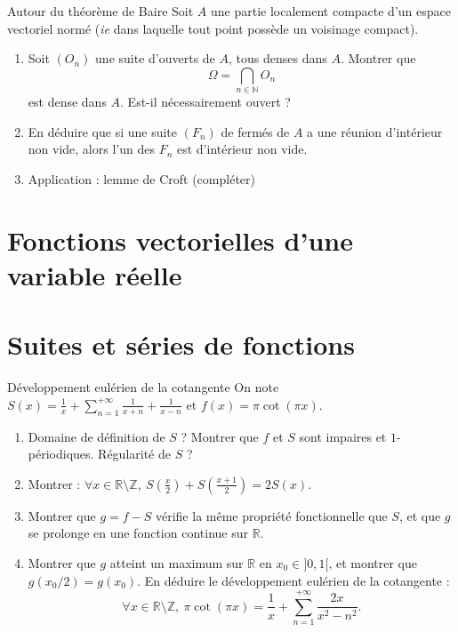 \documentclass[french]{book}
\newcommand{\N}{\mathbb{N}}
\newcommand{\Z}{\mathbb{Z}}
\newcommand{\R}{\mathbb{R}}
\theoremstyle{definition}
\theoremstyle{remark}
\begin{document}
\begin{exo}[3]{Autour du théorème de Baire}
	Soit $A$ une partie localement compacte d'un espace vectoriel normé (\textit{ie} dans laquelle tout point possède un voisinage compact).
	\begin{enumerate}
		\item Soit $(O_n)$ une suite d'ouverts de $A$, tous denses dans $A$. Montrer que $$\Omega=\bigcap_{n\in\N} O_n$$ est dense dans $A$. Est-il nécessairement ouvert ?
		\item En déduire que si une suite $(F_n)$ de fermés de $A$ a une réunion d'intérieur non vide, alors l'un des $F_n$ est d'intérieur non vide.
		\item Application : lemme de Croft (compléter)
	\end{enumerate}
\end{exo}

\chapter{Fonctions vectorielles d'une variable réelle}



\chapter{Suites et séries de fonctions}

\begin{exo}[2]{Développement eulérien de la cotangente}
	On note $S(x)=\displaystyle\frac{1}{x}+\sum_{n=1}^{+\infty}\frac{1}{x+n}+\frac{1}{x-n}$ et $f(x)=\pi\cot(\pi x)$.
	\begin{enumerate}
		\item Domaine de définition de $S$ ? Montrer que $f$ et $S$ sont impaires et $1$-périodiques. Régularité de $S$ ?
		\item Montrer : $\displaystyle\forall x\in\R\setminus\Z,\ S\left(\frac{x}{2}\right)+S\left(\frac{x+1}{2}\right)=2S(x)$.
		\item Montrer que $g=f-S$ vérifie la même propriété fonctionnelle que $S$, et que $g$ se prolonge en une fonction continue sur $\R$.
		\item Montrer que $g$ atteint un maximum sur $\R$ en $x_0\in]0,1[$, et montrer que $g(x_0/2)=g(x_0)$. En déduire le développement eulérien de la cotangente :
		$$\forall x\in\R\setminus\Z,\ \pi\cot(\pi x)=\frac{1}{x}+\sum_{n=1}^{+\infty}\frac{2x}{x^2-n^2}.$$
	\end{enumerate}
\end{exo}
\end{document}
